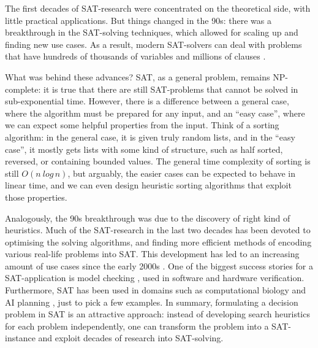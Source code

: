 
The first decades of SAT-research were concentrated on the theoretical side, with little practical applications.
But things changed in the 90s: there was a breakthrough in the SAT-solving techniques,
which allowed for scaling up and finding new use cases. As a result, modern SAT-solvers can deal with problems that have hundreds of thousands of variables and millions of clauses \cite{marques_silva2010}.

What was behind these advances? SAT, as a general problem, remains NP-complete:
it is true that there are still SAT-problems that cannot be solved in sub-exponential time.
However, there is a difference between a general case, where the algorithm must be prepared for any input, and an ``easy case'', where we can expect some helpful properties from the input.
Think of a sorting algorithm: in the general case, it is given truly random lists, and in the ``easy case'', it mostly gets lists with some kind of structure, such as half sorted, reversed, or containing bounded values. The general time complexity of sorting is still $O(n\ log\, n)$, but arguably, the easier cases can be expected to behave in linear time, and we can even design heuristic sorting algorithms that exploit those properties.

Analogously, the 90s breakthrough was due to the discovery of right kind of heuristics.
Much of the SAT-research in the last two decades has been devoted to optimising the solving algorithms, and finding more efficient methods of encoding various real-life problems into SAT.
This development has led to an increasing amount of use cases since the early 2000s \cite{claessen2009satpractice}.
One of the biggest success stories for a SAT-application is model checking \cite{sheeran1998modelchecking,biere1999modelchecking,bradley2011modelchecking}, used in software and hardware verification. Furthermore, SAT has been used in domains such as computational biology \cite{claessen2013compbioSAT} and AI planning \cite{selman_kautz92aiplanning}, just to pick a few examples.
In summary, formulating a decision problem in SAT is an attractive approach: instead of developing search heuristics for each problem independently, one can transform the problem into a SAT-instance and exploit decades of research into SAT-solving.


